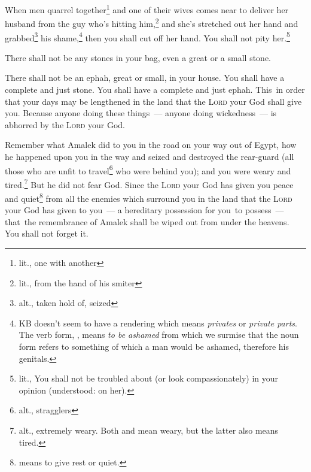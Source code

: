 \begin{inparaenum}
     When men quarrel together\footnote{lit., one with another} and one of their wives comes near to deliver her husband from the guy who's hitting him,\footnote{lit., from the hand of his smiter} and she's stretched out her hand and grabbed\footnote{alt., taken hold of, seized} his shame,\footnote{KB doesn't seem to have a rendering which means \textit{privates} or \textit{private parts}. The verb form, , means \textit{to be ashamed} from which we surmise that the noun form refers to something of which a man would be ashamed, therefore his genitals.}%
     then you shall cut off her hand. You shall not pity her.\footnote{lit., You shall not be troubled about (or look compassionately) in your opinion (understood: on her).}%
    
     There shall not be any stones in your bag, even a great or a small stone.%
    
     There shall not be an ephah, great or small, in your house.%
     You shall have a complete and just stone. You shall have a complete and just ephah. This\understood\ in order that your days may be lengthened in the land that the \textsc{Lord} your God shall give you.%
     Because anyone doing these things~--- anyone doing wickedness~--- is abhorred by the \textsc{Lord} your God.%
    
     Remember what Amalek did to you in the road on your way out of Egypt,%
     how he happened upon you in the way and seized and destroyed the rear-guard (all those who are unfit to travel\footnote{alt., stragglers} who were behind you); and you were weary and tired.\footnote{alt., extremely weary. Both  and  mean weary, but the latter also means tired.} But he did not fear God.%
     Since the \textsc{Lord} your God has given you peace and quiet\footnote{ means to give rest or quiet.} from all the enemies which surround you in the land that the \textsc{Lord} your God has given to you~--- a hereditary possession for you\understood\ to possess~--- that\understood\ the remembrance of Amalek shall be wiped out from under the heavens. You shall not forget it.%
\end{inparaenum}
